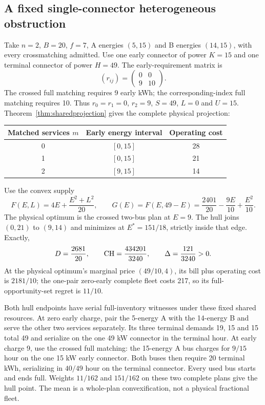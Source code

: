 \subsection{A fixed single-connector heterogeneous obstruction}
Take $n=2$, $B=20$, $f=7$, A energies $(5,15)$ and B energies
$(14,15)$, with every crossmatching admitted. Use one early connector
of power $K=15$ and one terminal connector of power $H=49$.
The early-requirement matrix is
\[
 (r_{ij})=\begin{pmatrix}0&0\\9&10\end{pmatrix}.
\]
The crossed full matching requires 9 early kWh; the corresponding-index
full matching requires 10. Thus $r_0=r_1=0$, $r_2=9$, $S=49$,
$L=0$ and $U=15$. Theorem~\ref{thm:sharedprojection} gives the complete
physical projection:
\begin{center}
\begin{tabular}{ccc}
\toprule
Matched services $m$ & Early energy interval & Operating cost\\
\midrule
0 & $[0,15]$ & 28\\
1 & $[0,15]$ & 21\\
2 & $[9,15]$ & 14\\
\bottomrule
\end{tabular}
\end{center}
Use the convex supply
\[
 F(E,L)=4E+\frac{E^2+L^2}{20},\qquad
 G(E)=F(E,49-E)=\frac{2401}{20}-\frac{9E}{10}+\frac{E^2}{10}.
\]
The physical optimum is the crossed two-bus plan at $E=9$. The hull
joins $(0,21)$ to $(9,14)$ and minimizes at $E^*=151/18$, strictly
inside that edge. Exactly,
\begin{equation}\label{eq:heteroexample}
 D=\frac{2681}{20},\qquad\mathrm{CH}=\frac{434201}{3240},\qquad
 \Delta=\frac{121}{3240}>0.
\end{equation}
At the physical optimum's marginal price $(49/10,4)$, its bill plus
operating cost is $2181/10$; the one-pair zero-early complete fleet costs
217, so its full-opportunity-set regret is $11/10$.

Both hull endpoints have serial full-inventory witnesses under these
fixed shared resources. At zero early charge, pair the 5-energy A with
the 14-energy B and serve the other two services separately. Its three
terminal demands 19, 15 and 15 total 49 and serialize on the one 49 kW
connector in the terminal hour. At early charge 9, use the crossed full
matching: the 15-energy A bus charges for $9/15$ hour on the one 15 kW
early connector. Both buses then require 20 terminal kWh, serializing in
$40/49$ hour on the terminal connector. Every used bus starts and ends
full. Weights $11/162$ and $151/162$ on these two complete plans give
the hull point. The mean is a whole-plan convexification, not a physical
fractional fleet.

